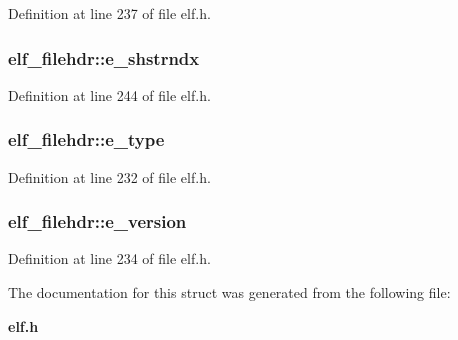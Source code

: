 Definition at line 237 of file elf.h.
\subsubsection[{e\_\-shstrndx}]{ {\bf elf\_\-filehdr::e\_\-shstrndx}}\label{structelf__filehdr_facd2d83ef2c03c20d7a8b8c02b880e7}




Definition at line 244 of file elf.h.
\subsubsection[{e\_\-type}]{ {\bf elf\_\-filehdr::e\_\-type}}\label{structelf__filehdr_596fb3bc0db962eaba2bd6b5f94dad28}




Definition at line 232 of file elf.h.
\subsubsection[{e\_\-version}]{ {\bf elf\_\-filehdr::e\_\-version}}\label{structelf__filehdr_397226d87d1bc1e073c42b118e814005}




Definition at line 234 of file elf.h.

The documentation for this struct was generated from the following file:\begin{CompactItemize}
\item 
{\bf elf.h}\end{CompactItemize}
